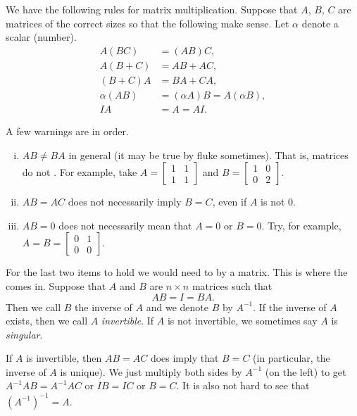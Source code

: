 We have the following rules for matrix multiplication.  Suppose that
$A$, $B$, $C$ are matrices of the correct sizes so that the following
make sense.  Let $\alpha$ denote a scalar (number).
\begin{align*}
A(BC) & = (AB)C, \\
A(B+C) & = AB + AC, \\
(B+C)A & = BA + CA, \\
\alpha(AB) & = (\alpha A)B = A(\alpha B), \\
IA & = A = AI .
\end{align*}

\pagebreak[2]
A few warnings are in order.
\begin{enumerate}[(i)]
\item $AB \not= BA$ in general (it may be true by fluke sometimes).  That is,
matrices do not .
For example, take
$A = \left[ \begin{smallmatrix} 1 & 1 \\ 1 & 1 \end{smallmatrix} \right]$
and
$B = \left[ \begin{smallmatrix} 1 & 0 \\ 0 & 2 \end{smallmatrix} \right]$.
\item $AB = AC$ does not necessarily imply $B=C$, even if $A$ is not 0.
\item $AB = 0$ does not necessarily mean that $A=0$ or $B=0$.
Try, for example,
$A = B = \left[ \begin{smallmatrix} 0 & 1 \\ 0 & 0 \end{smallmatrix}
\right]$.
\end{enumerate}

For the last two items to hold we would need to  by
a matrix.  This is where the \emph{} comes in.
Suppose that $A$ and $B$ are $n \times n$ matrices such that
\begin{equation*}
AB = I = BA .
\end{equation*}
Then we call $B$ the inverse of $A$ and we denote $B$ by $A^{-1}$.
If the inverse of $A$ exists, then we call $A$
\emph{invertible}.
If $A$ is not invertible, we sometimes say $A$ is
\emph{singular}.

If $A$ is invertible, then $AB = AC$ does imply
that $B = C$ (in particular, the inverse of $A$ is unique).
We just multiply both sides by $A^{-1}$ (on the left) to get
$A^{-1}AB = A^{-1}AC$ or $IB=IC$ or $B=C$.
It is also not hard to see that ${(A^{-1})}^{-1} = A$.

